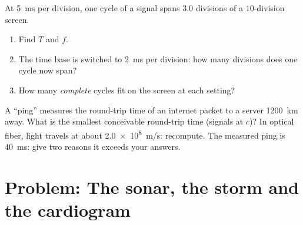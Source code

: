 \begin{exercise}[$\star\star\star$]\label{exo:g10:signals-and-waves:14}
At \qty{5}{ms} per division, one cycle of a signal spans $3.0$ divisions
of a $10$-division screen.
\begin{enumerate}
  \item Find $T$ and $f$.
  \item The time base is switched to \qty{2}{ms} per division: how many
        divisions does one cycle now span?
  \item How many \emph{complete} cycles fit on the screen at each
        setting?
\end{enumerate}
\end{exercise}

\begin{exercise}[$\star\star\star$]\label{exo:g10:signals-and-waves:15}
A ``ping'' measures the round-trip time of an internet packet to a
server \qty{1200}{km} away. What is the smallest conceivable round-trip
time (signals at $c$)? In optical fiber, light travels at about
\qty{2.0e8}{m/s}: recompute. The measured ping is \qty{40}{ms}: give two
reasons it exceeds your answers.
\end{exercise}

\section{Problem: The sonar, the storm and the cardiogram}

